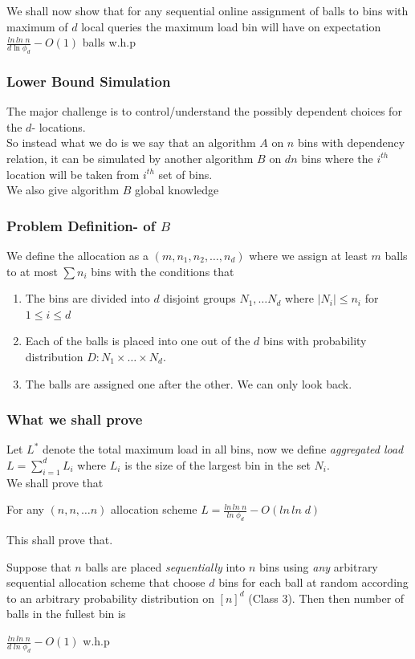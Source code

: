 \documentclass{beamer}
\begin{document}
\begin{frame}
\begin{center}
 We shall now show that for any sequential online assignment of balls to bins with maximum of $d$ local queries the maximum load bin will have on expectation $\frac{ln \, ln \; n}{d \ln \phi_d} - O(1)$ balls w.h.p
\end{center}
\end{frame}

\begin{frame}
\frametitle{Lower Bound Simulation}
The major challenge is to control/understand the possibly dependent choices for the $d$- locations. \\ So instead what we do is we say that  an algorithm $A$ on $n$ bins with dependency relation, it can be simulated by another algorithm $B$ on $dn$ bins where the $i^{th}$ location will be taken from $i^{th}$ set of bins. \\
We also give algorithm $B$ global knowledge \\
\end{frame}

\begin{frame}
 \frametitle{Problem Definition- of $B$}
We define the allocation as a $(m,n_1,n_2,\ldots,n_d)$ where we assign at least $m$ balls to at most $\sum n_i$ bins with the conditions that 
\begin{enumerate}
\item The bins are divided into $d$ disjoint groups $N_1, \ldots N_d$ where $|N_i| \leq n_i$ for $1 \leq i \leq d$
\item Each of the balls is placed into one out of the $d$ bins with probability distribution $D: N_1 \times \ldots \times N_d$.
\item The balls are assigned one after the other. We can only look back. 
\end{enumerate}

\end{frame}

\begin{frame}
\frametitle{What we shall prove}
Let $L^*$ denote the total maximum load in all bins, now we define \textit{aggregated load} $L= \sum_{i=1}^d L_i$ where $L_i$ is the size of the largest bin in the set $N_i$. \\
We shall prove that 
\begin{theorem}
 For any $(n,n,\ldots  n)$ allocation scheme $L= \frac{ln \, ln \; n}{ln \; \phi_d} - O(ln \, ln\; d)$ 
\end{theorem}
This shall prove that. \\
\begin{theorem}
Suppose that $n$ balls are placed \textit{sequentially} into $n$ bins using \textit{any} arbitrary sequential allocation scheme that choose $d$ bins for each ball at random according to an arbitrary probability distribution on $[n]^d$ (Class 3). Then then number of balls in the fullest bin is   \\
\begin{center}
$\frac{ln \, ln \; n}{d \; ln \; {\phi_d} }  - O(1)$ w.h.p
\end{center}
\end{theorem}
\end{frame}
\end{document}
